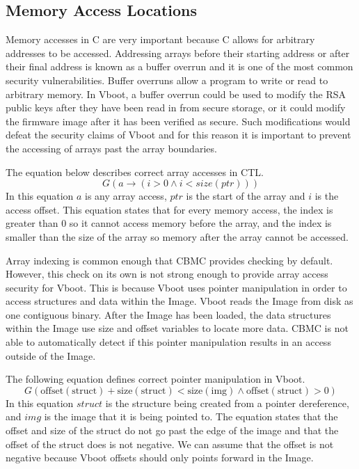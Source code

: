 \subsection{Memory Access Locations}

Memory accesses in C are very important because C allows for arbitrary addresses to be accessed. 
Addressing arrays before their starting address or after their final address is known as a buffer overrun and it is one of the most common security vulnerabilities. 
Buffer overruns allow a program to write or read to arbitrary memory. 
In Vboot, a buffer overrun could be used to modify the RSA public keys after they have been read in from secure storage, or it could modify the firmware image after it has been verified as secure. 
Such modifications would defeat the security claims of Vboot and for this reason it is important to prevent the accessing of arrays past the array boundaries.

The equation below describes correct array accesses in CTL. 
\begin{equation}
    G(a \to (i > 0 \land i < size(ptr)))
\end{equation}
In this equation $a$ is any array access, $ptr$ is the start of the array and $i$ is the access offset.
This equation states that for every memory access, the index is greater than 0 so it cannot access memory before the array,  and the index is smaller than the size of the array so memory after the array cannot be accessed.

Array indexing is common enough that CBMC provides checking by default.
However, this check on its own is not strong enough to provide array access security for Vboot. 
This is because Vboot uses pointer manipulation in order to access structures and data within the Image. 
Vboot reads the Image from disk as one contiguous binary. 
After the Image has been loaded, the data structures within the Image use size and offset variables to locate more data.
CBMC is not able to automatically detect if this pointer manipulation results in an access outside of the Image.

The following equation defines correct pointer manipulation in Vboot. 
\begin{equation}
    G(\text{offset}(\text{struct}) + \text{size}(\text{struct}) <
    \text{size}(\text{img}) \land \text{offset}(\text{struct}) > 0)
\end{equation}
In this equation $struct$ is the structure being created from a pointer dereference, and $img$ is the image that it is being pointed to.
The equation states that the offset and size of the struct do not go past the edge of the image and that the offset of the struct does is not negative.
We can assume that the offset is not negative because Vboot offsets should only points forward in the Image.

